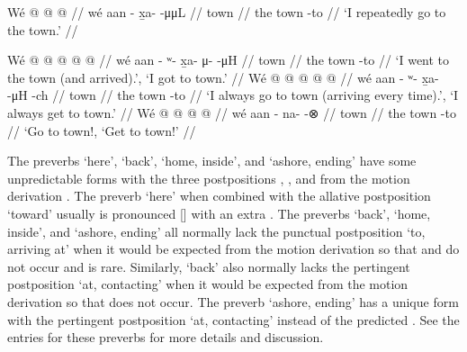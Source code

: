 \ex\label{ex:inventory-preverb-F-repimpfv}%
\begingl
	\gla	Wé  @ {}  @ {} @ {} //
	\glb	wé aan - x̱a-  -μμL //
	\glc	{} town \· \·  \· //
	\gld	the town -to  {} {} //
	\glft	‘I repeatedly go to the town.’
		//
\endgl
\xe

\pex\label{ex:inventory-preverb-F-rest}%
\a\label{ex:inventory-preverb-F-rest-pfv}%
%
\begingl
	\gla	Wé  @ {}  @ {} @ {} @ {} @ {} //
	\glb	wé aan - ʷ- x̱a- μ-  -μH //
	\glc	{} town \· \· \· \·  \· //
	\gld	the town -to  {} {} {} {} //
	\glft	‘I went to the town (and arrived).’, ‘I got to town.’
		//
\endgl
\a\label{ex:inventory-preverb-F-rest-hab}%
%
\begingl
	\gla	Wé  @ {}  @ {} @ {} @ {} @ {} //
	\glb	wé aan - ʷ- x̱a-  -μH -ch //
	\glc	{} town \· \· \· \·  \· //
	\gld	the town -to  {} {} {} {} //
	\glft	‘I always go to town (arriving every time).’, ‘I always get to town.’
		//
\endgl
\a\label{ex:inventory-preverb-F-rest-imp}%
%
\begingl
	\gla	Wé  @ {}  @ {} @ {} @ {} //
	\glb	wé aan - na- {}  -⊗ //
	\glc	{} town \· \· \·  \· //
	\gld	the town -to  {} {} {} //
	\glft	‘Go to town!, ‘Get to town!’
		//
\endgl
\xe

The preverbs  ‘here’,  ‘back’,  ‘home, inside’,
	and  ‘ashore, ending’ have some unpredictable forms
	with the three postpositions , , and 
	from the motion derivation .
The preverb  ‘here’ when combined with the allative postposition  ‘toward’
	usually is pronounced  [] with an extra .
The preverbs  ‘back’,  ‘home, inside’, and  ‘ashore, ending’
	all normally lack the punctual postposition  ‘to, arriving at’
	when it would be expected from the  motion derivation
	so that  and  do not occur and  is rare.
Similarly,  ‘back’ also normally lacks the pertingent postposition  ‘at, contacting’
	when it would be expected from the  motion derivation
	so that  does not occur.
The preverb  ‘ashore, ending’ has a unique form 
	with the pertingent postposition  ‘at, contacting’
	instead of the predicted .
See the entries for these preverbs for more details and discussion.


